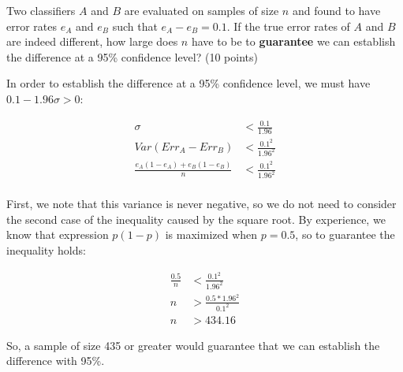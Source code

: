 \documentclass[fleqn]{homework}
\begin{document}
  \begin{problem}{2}
    \begin{question}
      Two classifiers $A$ and $B$ are evaluated on samples of size $n$ and found
      to have error rates $e_A$ and $e_B$ such that $e_A - e_B = 0.1$.  If the
      true error rates of $A$ and $B$ are indeed different, how large does $n$
      have to be to \textbf{guarantee} we can establish the difference at a 95\%
      confidence level? (10 points)
    \end{question}

    In order to establish the difference at a 95\% confidence level, we must
    have $0.1 - 1.96\sigma > 0$:

    \begin{align}
      \sigma &< \frac{0.1}{1.96} \\
      Var(Err_A - Err_B) &< \frac{0.1^2}{1.96^2} \\
      \frac{e_A(1-e_A) + e_B(1-e_B)}{n} &< \frac{0.1^2}{1.96^2} \\ 
    \end{align}

    First, we note that this variance is never negative, so we do not need to
    consider the second case of the inequality caused by the square root.  By
    experience, we know that expression $p(1-p)$ is maximized when $p=0.5$, so
    to guarantee the inequality holds:

    \begin{align}
      \frac{0.5}{n} &< \frac{0.1^2}{1.96^2} \\
      n &> \frac{0.5 * 1.96^2}{0.1^2} \\
      n &> 434.16
    \end{align}
  \end{problem}

  So, a sample of size 435 or greater would guarantee that we can establish the
  difference with 95\%.
\end{document}
